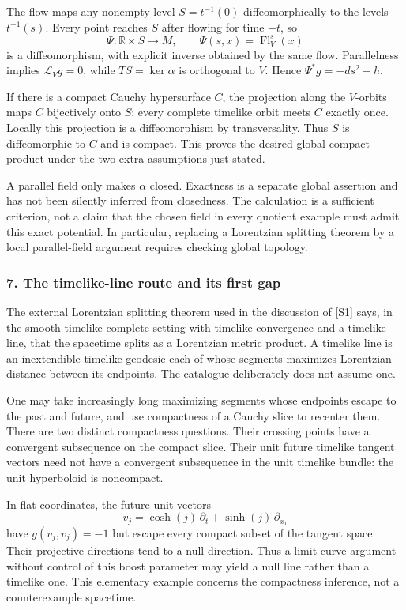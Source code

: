 \documentclass[11pt]{article}
\begin{document}
The flow maps any nonempty level $S=t^{-1}(0)$ diffeomorphically to the levels $t^{-1}(s)$. Every point reaches $S$ after flowing for time $-t$, so
\[
 \Psi:\mathbb R\times S\longrightarrow M,\qquad
 \Psi(s,x)=\operatorname{Fl}_V^s(x)
\]
is a diffeomorphism, with explicit inverse obtained by the same flow. Parallelness implies $\mathcal L_Vg=0$, while $TS=\ker\alpha$ is orthogonal to $V$. Hence $\Psi^*g=-ds^2+h$.

If there is a compact Cauchy hypersurface $C$, the projection along the $V$-orbits maps $C$ bijectively onto $S$: every complete timelike orbit meets $C$ exactly once. Locally this projection is a diffeomorphism by transversality. Thus $S$ is diffeomorphic to $C$ and is compact. This proves the desired global compact product under the two extra assumptions just stated.

A parallel field only makes $\alpha$ closed. Exactness is a separate global assertion and has not been silently inferred from closedness. The calculation is a sufficient criterion, not a claim that the chosen field in every quotient example must admit this exact potential. In particular, replacing a Lorentzian splitting theorem by a local parallel-field argument requires checking global topology.

\subsubsection{7. The timelike-line route and its first gap}
The external Lorentzian splitting theorem used in the discussion of [S1] says, in the smooth timelike-complete setting with timelike convergence and a timelike line, that the spacetime splits as a Lorentzian metric product. A timelike line is an inextendible timelike geodesic each of whose segments maximizes Lorentzian distance between its endpoints. The catalogue deliberately does not assume one.

One may take increasingly long maximizing segments whose endpoints escape to the past and future, and use compactness of a Cauchy slice to recenter them. There are two distinct compactness questions. Their crossing points have a convergent subsequence on the compact slice. Their unit future timelike tangent vectors need not have a convergent subsequence in the unit timelike bundle: the unit hyperboloid is noncompact.

In flat coordinates, the future unit vectors
\[
 v_j=\cosh(j)\,\partial_t+\sinh(j)\,\partial_{x_1}
\]
have $g(v_j,v_j)=-1$ but escape every compact subset of the tangent space. Their projective directions tend to a null direction. Thus a limit-curve argument without control of this boost parameter may yield a null line rather than a timelike one. This elementary example concerns the compactness inference, not a counterexample spacetime.
\end{document}
